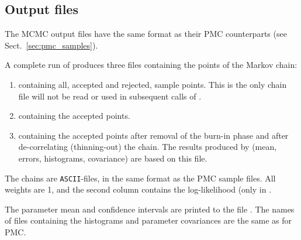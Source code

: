 \documentclass[11pt, chapterprefix, headsepline]{scrartcl}
\begin{document}
\begin{appendix}
\subsection{Output files}

The MCMC output files have the same format as their PMC counterparts (see Sect.~\ref{sec:pmc_samples}).

A complete run of  produces three files containing
the points of the Markov chain:

\begin{enumerate}
\item {} containing all, accepted and rejected, sample
  points. This is the only chain file will not be read or used in subsequent calls of
  .

  \item {} containing the accepted points.

  \item {} containing the accepted points after
    removal of the burn-in phase and after de-correlating
    (thinning-out) the chain. The results produced by 
    (mean, errors, histograms, covariance) are based on this file.
\end{enumerate}

The chains are \texttt{ASCII}-files, in the same format as the PMC
sample files. All weights are 1, and the second column contains the
log-likelihood (only in .


The parameter mean and confidence intervals are printed to the file
. The names of files containing the histograms and parameter
covariances are the same as for PMC.







\end{appendix}
\end{document}
